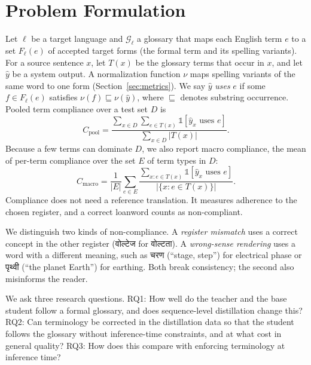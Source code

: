 \documentclass[conference]{IEEEtran}
\newcommand{\dev}[1]{{\devfont #1}}
\begin{document}
\section{Problem Formulation}

Let $\ell$ be a target language and $\mathcal{G}_\ell$ a glossary that maps each English term $e$ to a set $F_\ell(e)$ of accepted target forms (the formal term and its spelling variants). For a source sentence $x$, let $T(x)$ be the glossary terms that occur in $x$, and let $\hat{y}$ be a system output. A normalization function $\nu$ maps spelling variants of the same word to one form (Section~\ref{sec:metrics}). We say $\hat{y}$ \emph{uses} $e$ if some $f \in F_\ell(e)$ satisfies $\nu(f) \sqsubseteq \nu(\hat{y})$, where $\sqsubseteq$ denotes substring occurrence. Pooled term compliance over a test set $D$ is
\begin{equation}
C_{\text{pool}} = \frac{\sum_{x \in D} \sum_{e \in T(x)} \mathbb{1}\left[\hat{y}_x \text{ uses } e\right]}{\sum_{x \in D} |T(x)|}.
\end{equation}
Because a few terms can dominate $D$, we also report macro compliance, the mean of per-term compliance over the set $E$ of term types in $D$:
\begin{equation}
C_{\text{macro}} = \frac{1}{|E|} \sum_{e \in E} \frac{\sum_{x: e \in T(x)} \mathbb{1}\left[\hat{y}_x \text{ uses } e\right]}{|\{x : e \in T(x)\}|}.
\end{equation}
Compliance does not need a reference translation. It measures adherence to the chosen register, and a correct loanword counts as non-compliant.

We distinguish two kinds of non-compliance. A \emph{register mismatch} uses a correct concept in the other register (\dev{वोल्टेज} for \dev{वोल्टता}). A \emph{wrong-sense rendering} uses a word with a different meaning, such as \dev{चरण} (``stage, step'') for electrical phase or \dev{पृथ्वी} (``the planet Earth'') for earthing. Both break consistency; the second also misinforms the reader.

We ask three research questions. RQ1: How well do the teacher and the base student follow a formal glossary, and does sequence-level distillation change this? RQ2: Can terminology be corrected in the distillation data so that the student follows the glossary without inference-time constraints, and at what cost in general quality? RQ3: How does this compare with enforcing terminology at inference time?
\end{document}
